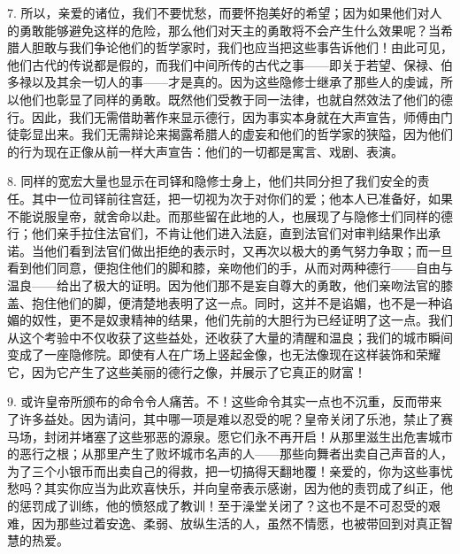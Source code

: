 7. 所以，亲爱的诸位，我们不要忧愁，而要怀抱美好的希望；因为如果他们对人的勇敢能够避免这样的危险，那么他们对天主的勇敢将不会产生什么效果呢？当希腊人胆敢与我们争论他们的哲学家时，我们也应当把这些事告诉他们！由此可见，他们古代的传说都是假的，而我们中间所传的古代之事——即关于若望、保禄、伯多禄以及其余一切人的事——才是真的。因为这些隐修士继承了那些人的虔诚，所以他们也彰显了同样的勇敢。既然他们受教于同一法律，也就自然效法了他们的德行。因此，我们无需借助著作来显示德行，因为事实本身就在大声宣告，师傅由门徒彰显出来。我们无需辩论来揭露希腊人的虚妄和他们的哲学家的狭隘，因为他们的行为现在正像从前一样大声宣告：他们的一切都是寓言、戏剧、表演。\par

8. 同样的宽宏大量也显示在司铎和隐修士身上，他们共同分担了我们安全的责任。其中一位司铎前往宫廷，把一切视为次于对你们的爱；他本人已准备好，如果不能说服皇帝，就舍命以赴。而那些留在此地的人，也展现了与隐修士们同样的德行；他们亲手拉住法官们，不肯让他们进入法庭，直到法官们对审判结果作出承诺。当他们看到法官们做出拒绝的表示时，又再次以极大的勇气努力争取；而一旦看到他们同意，便抱住他们的脚和膝，亲吻他们的手，从而对两种德行——自由与温良——给出了极大的证明。因为他们那不是妄自尊大的勇敢，他们亲吻法官的膝盖、抱住他们的脚，便清楚地表明了这一点。同时，这并不是谄媚，也不是一种谄媚的奴性，更不是奴隶精神的结果，他们先前的大胆行为已经证明了这一点。我们从这个考验中不仅收获了这些益处，还收获了大量的清醒和温良；我们的城市瞬间变成了一座隐修院。即使有人在广场上竖起金像，也无法像现在这样装饰和荣耀它，因为它产生了这些美丽的德行之像，并展示了它真正的财富！\par

9. 或许皇帝所颁布的命令令人痛苦。不！这些命令其实一点也不沉重，反而带来了许多益处。因为请问，其中哪一项是难以忍受的呢？皇帝关闭了乐池，禁止了赛马场，封闭并堵塞了这些邪恶的源泉。愿它们永不再开启！从那里滋生出危害城市的恶行之根；从那里产生了败坏城市名声的人——那些向舞者出卖自己声音的人，为了三个小银币而出卖自己的得救，把一切搞得天翻地覆！亲爱的，你为这些事忧愁吗？其实你应当为此欢喜快乐，并向皇帝表示感谢，因为他的责罚成了纠正，他的惩罚成了训练，他的愤怒成了教训！至于澡堂关闭了？这也不是不可忍受的艰难，因为那些过着安逸、柔弱、放纵生活的人，虽然不情愿，也被带回到对真正智慧的热爱。\par

